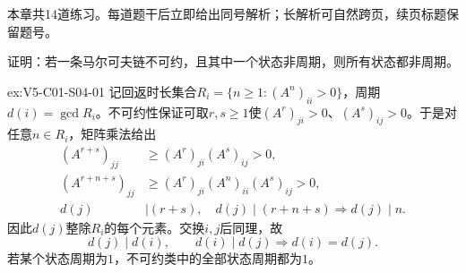 \nopagebreak[4]

\begin{chapterexercisebox}
\label{struct:V5-C01-CH35}
本章共14道练习。每道题干后立即给出同号解析；长解析可自然跨页，续页标题保留题号。
\end{chapterexercisebox}

\begin{SLChapterExercisePairSection}

\SLSourceBookExercises

\begin{exercise}\label{ex:V5-C01-S04-01}
证明：若一条马尔可夫链不可约，且其中一个状态非周期，则所有状态都非周期。
\end{exercise}
\ifSLFullEdition
{}\label{sol:V5-C01-S04-01}
\begin{chapterexercisesolution}{ex:V5-C01-S04-01}
记回返时长集合$R_i=\{n\ge1:(A^n)_{ii}>0\}$，周期$d(i)=\gcd R_i$。不可约性保证可取$r,s\ge1$使$(A^r)_{ji}>0$、$(A^s)_{ij}>0$。于是对任意$n\in R_i$，矩阵乘法给出
\[
\begin{aligned}
(A^{r+s})_{jj}&\ge (A^r)_{ji}(A^s)_{ij}>0,\\
(A^{r+n+s})_{jj}&\ge (A^r)_{ji}(A^n)_{ii}(A^s)_{ij}>0,\\
d(j)&\mid(r+s),\quad d(j)\mid(r+n+s)
\Longrightarrow d(j)\mid n.
\end{aligned}
\]
因此$d(j)$整除$R_i$的每个元素。交换$i,j$后同理，故
\[
d(j)\mid d(i),\qquad d(i)\mid d(j)
\Longrightarrow d(i)=d(j).
\]
若某个状态周期为$1$，不可约类中的全部状态周期都为$1$。
\end{chapterexercisesolution}
\fi


\end{SLChapterExercisePairSection}
